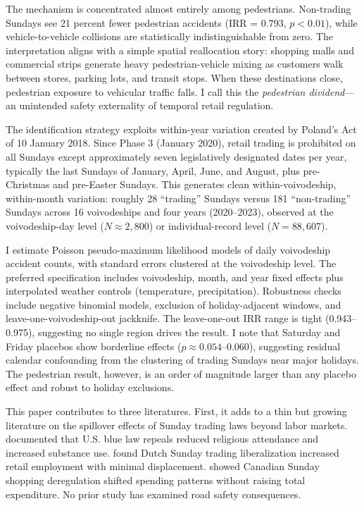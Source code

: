 \documentclass[12pt]{article}
\begin{document}
The mechanism is concentrated almost entirely among pedestrians. Non-trading Sundays see 21 percent fewer pedestrian accidents (IRR = 0.793, $p < 0.01$), while vehicle-to-vehicle collisions are statistically indistinguishable from zero. The interpretation aligns with a simple spatial reallocation story: shopping malls and commercial strips generate heavy pedestrian-vehicle mixing as customers walk between stores, parking lots, and transit stops. When these destinations close, pedestrian exposure to vehicular traffic falls. I call this the \textit{pedestrian dividend}---an unintended safety externality of temporal retail regulation.

The identification strategy exploits within-year variation created by Poland's Act of 10 January 2018. Since Phase 3 (January 2020), retail trading is prohibited on all Sundays except approximately seven legislatively designated dates per year, typically the last Sundays of January, April, June, and August, plus pre-Christmas and pre-Easter Sundays. This generates clean within-voivodeship, within-month variation: roughly 28 ``trading'' Sundays versus 181 ``non-trading'' Sundays across 16 voivodeships and four years (2020--2023), observed at the voivodeship-day level ($N \approx 2{,}800$) or individual-record level ($N = 88{,}607$).

I estimate Poisson pseudo-maximum likelihood models of daily voivodeship accident counts, with standard errors clustered at the voivodeship level. The preferred specification includes voivodeship, month, and year fixed effects plus interpolated weather controls (temperature, precipitation). Robustness checks include negative binomial models, exclusion of holiday-adjacent windows, and leave-one-voivodeship-out jackknife. The leave-one-out IRR range is tight (0.943--0.975), suggesting no single region drives the result. I note that Saturday and Friday placebos show borderline effects ($p \approx 0.054$--$0.060$), suggesting residual calendar confounding from the clustering of trading Sundays near major holidays. The pedestrian result, however, is an order of magnitude larger than any placebo effect and robust to holiday exclusions.

This paper contributes to three literatures. First, it adds to a thin but growing literature on the spillover effects of Sunday trading laws beyond labor markets. \citet{gruber2004religious} documented that U.S. blue law repeals reduced religious attendance and increased substance use. \citet{gerritsen2014effects} found Dutch Sunday trading liberalization increased retail employment with minimal displacement. \citet{skuterud2005impact} showed Canadian Sunday shopping deregulation shifted spending patterns without raising total expenditure. No prior study has examined road safety consequences.
\end{document}
